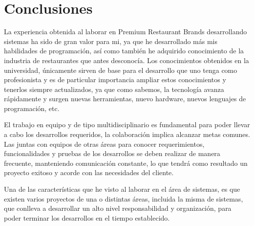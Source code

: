 
\chapter{Conclusiones}
\label{chap:conclusiones}

La experiencia obtenida al laborar en Premium Restaurant Brands desarrollando sistemas ha sido de gran valor para mi, ya que he desarrollado más mis habilidades de programación, así como también he adquirido conocimiento de la industria de restaurantes que antes desconocía. Los conocimientos obtenidos en la universidad, únicamente sirven de base para el desarrollo que uno tenga como profesionista y es de particular importancia ampliar estos conocimientos y tenerlos siempre actualizados, ya que como sabemos, la tecnología avanza rápidamente y surgen nuevas herramientas, nuevo hardware, nuevos lenguajes de programación, etc.

El trabajo en equipo y de tipo multidisciplinario es fundamental para poder llevar a cabo los desarrollos requeridos, la colaboración implica alcanzar metas comunes. Las juntas con equipos de otras áreas para conocer requerimientos, funcionalidades y pruebas de los desarrollos se deben realizar de manera frecuente, manteniendo comunicación constante, lo que tendrá como resultado un proyecto exitoso y acorde con las necesidades del cliente.

Una de las características que he visto al laborar en el área de sistemas, es que existen varios proyectos de una o distintas áreas, incluida la misma de sistemas, que conlleva a desarrollar un alto nivel responsabilidad y organización, para poder terminar los desarrollos en el tiempo establecido. 



